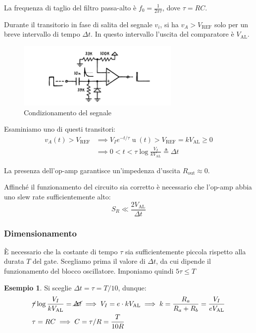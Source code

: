 \documentclass{article}
\newcommand{\var}[2]{#1_\mathrm{#2}}
\DeclareMathOperator{\ustep}{u}
\theoremstyle{definition}
\newtheorem{example}{Esempio}
\begin{document}
La frequenza di taglio del filtro passa-alto è \(f_0 = \frac{1}{2 \pi \tau}\), dove \(\tau = RC\).

Durante il transitorio in fase di salita del segnale \(v_i\), si ha \(v_A > \var{V}{REF}\) solo per un breve intervallo di tempo \(\Delta t\).
In questo intervallo l'uscita del comparatore è \(\var{V}{AL}\).

\begin{figure}[htp]
    \centering
    \includegraphics[width=0.7\textwidth]{gatebase.png} 
    \caption{Condizionamento del segnale}
    \label{fig:gate-to-trigger-condizionamento}
\end{figure}

Esaminiamo uno di questi transitori:
\begin{align}
    v_A(t) > \var{V}{REF} & \implies
    V_I e^{-t/\tau} \ustep(t) > \var{V}{REF} = k \var{V}{AL} \geq 0 \nonumber \\
    & \implies 0 < t < \tau \log\frac{V_I}{k \var{V}{AL}} \triangleq \Delta t
    \label{eq:trigger-dt}
\end{align}

La presenza dell'op-amp garantisce un'impedenza d'uscita \(\var{R}{out} \approx 0\).

Affinché il funzionamento del circuito sia corretto è necessario che l'op-amp abbia uno slew rate sufficientemente alto:
\begin{equation*}
    S_R \ll \frac{2 \var{V}{AL}}{\Delta t}
\end{equation*}

\subsubsection{Dimensionamento}
È necessario che la costante di tempo \(\tau\) sia sufficientemente piccola rispetto alla durata \(T\) del gate.
Scegliamo prima il valore di \(\Delta t\), da cui dipende il funzionamento del blocco oscillatore.
Imponiamo quindi \(5 \tau \le T\)

\begin{example}
    Si sceglie \(\Delta t = \tau = T/10\), dunque:
    \begin{align*}
        &\cancel{\tau} \log\frac{V_I}{k \var{V}{AL}} = \cancel{\Delta t} \implies
        V_I = e \cdot k \var{V}{AL} \implies
        k = \frac{R_a}{R_a + R_b} = \frac{V_I}{e \var{V}{AL}} \\
        &\tau = RC \implies C = \tau/R = \frac{T}{10R}
    \end{align*}
\end{example}
\end{document}
